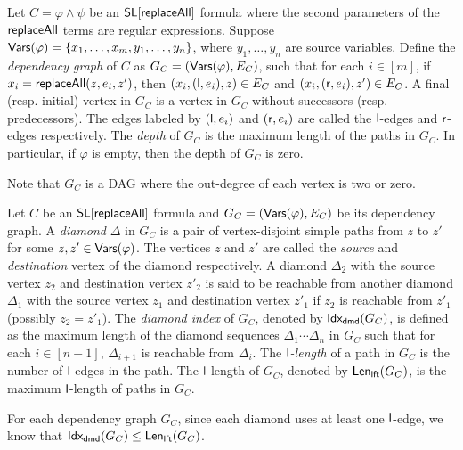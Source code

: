 \begin{definition}
\label{def:dep-graph}
	Let $C= \varphi \wedge \psi$ be an $\mathsf{SL}[\mathsf{replaceAll}]$ formula where the second parameters of the $\mathsf{replaceAll}$ terms are regular expressions. Suppose $\mathsf{Vars}(\varphi) = \{x_1,\dots, x_m, y_1, \dots, y_n\}$, where $y_1,\dots, y_n$ are  source variables. Define the \emph{dependency graph} of $C$ as $G_C= (\mathsf{Vars}(\varphi), E_C)$, such that for each $i \in [m]$, if $x_i = \mathsf{replaceAll}(z, e_i, z')$, then $(x_i, (\mathsf{l}, e_i), z) \in E_C$ and $(x_i, (\mathsf{r}, e_i), z') \in E_C$. A final (resp. initial) vertex in $G_C$ is a vertex in $G_C$ without successors (resp. predecessors). The edges labeled by $(\mathsf{l}, e_i)$ and $(\mathsf{r}, e_i)$ are called the $\mathsf{l}$-edges and $\mathsf{r}$-edges respectively. The \emph{depth} of $G_C$ is the maximum length of the paths in $G_C$. In particular, if $\varphi$ is empty, then the depth of $G_C$ is zero. 
\end{definition}
Note that $G_C$ is a DAG where the out-degree of each vertex is two or zero. 

\begin{definition}
Let $C$  be an  $\mathsf{SL}[\mathsf{replaceAll}]$ formula and $G_C=(\mathsf{Vars}(\varphi), E_C)$ be its dependency graph. A \emph{diamond} $\Delta$ in $G_C$ is a pair of vertex-disjoint simple paths from $z$ to $z'$ for some $z,z' \in \mathsf{Vars}(\varphi)$. The vertices $z$ and $z'$ are called the \emph{source} and \emph{destination} vertex of the diamond respectively. A diamond $\Delta_2$ with the source vertex $z_2$ and destination vertex $z'_2$ is said to be reachable from  another diamond $\Delta_1$ with the source vertex $z_1$ and destination vertex $z'_1$ if $z_2$ is reachable from $z'_1$ (possibly $z_2= z'_1$). The \emph{diamond index} of $G_C$, denoted by ${\sf Idx_{dmd}}(G_C)$, is defined as the maximum length of the diamond sequences $\Delta_1 \cdots \Delta_n$ in $G_C$ such that for each $i \in [n-1]$, $\Delta_{i+1}$ is reachable from $\Delta_i$. The \emph{$\mathsf{l}$-length} of a path in $G_C$ is the number of $\mathsf{l}$-edges in the path. The $\mathsf{l}$-length of $G_C$, denoted by ${\sf Len_{lft}}(G_C)$, is the maximum $\mathsf{l}$-length of paths in $G_C$.
\end{definition}
For each dependency graph $G_C$, since each diamond uses at least one $\mathsf{l}$-edge, we know that ${\sf Idx_{dmd}}(G_C) \le {\sf Len_{lft}}(G_C)$.

